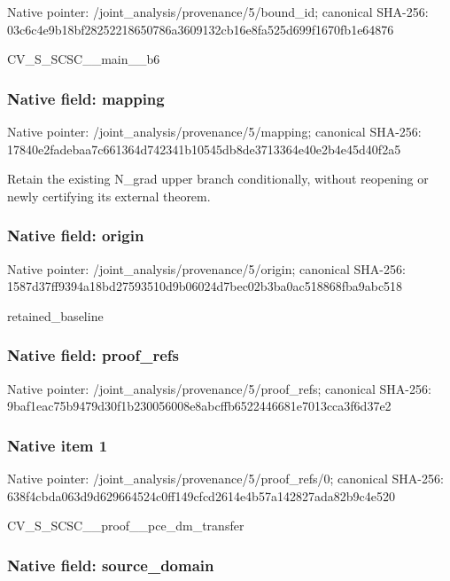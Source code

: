 \documentclass[10pt,a4paper]{article}
\begin{document}
Native pointer: /joint\_analysis/provenance/5/bound\_id; canonical SHA-256: 03c6c4e9b18bf28252218650\allowbreak{}786a3609132cb16e8fa525d6\allowbreak{}99f1670fb1e64876


CV\_S\_SCSC\_\_main\_\_b6


\subsubsection{Native field: mapping}


Native pointer: /joint\_analysis/provenance/5/mapping; canonical SHA-256: 17840e2fadebaa7c661364d7\allowbreak{}42341b10545db8de3713364e\allowbreak{}40e2b4e45d40f2a5


Retain the existing N\_grad upper branch conditionally, without reopening or newly certifying its external theorem.


\subsubsection{Native field: origin}


Native pointer: /joint\_analysis/provenance/5/origin; canonical SHA-256: 1587d37ff9394a18bd275935\allowbreak{}10d9b06024d7bec02b3ba0ac\allowbreak{}518868fba9abc518


retained\_baseline


\subsubsection{Native field: proof\_refs}


Native pointer: /joint\_analysis/provenance/5/proof\_refs; canonical SHA-256: 9baf1eac75b9479d30f1b230\allowbreak{}056008e8abcffb6522446681\allowbreak{}e7013cca3f6d37e2



\subsubsection{Native item 1}


Native pointer: /joint\_analysis/provenan\allowbreak{}ce/5/proof\_refs/0; canonical SHA-256: 638f4cbda063d9d629664524\allowbreak{}c0ff149cfcd2614e4b57a142\allowbreak{}827ada82b9c4e520


CV\_S\_SCSC\_\_proof\_\_pce\_dm\_transfer


\subsubsection{Native field: source\_domain}
\end{document}
